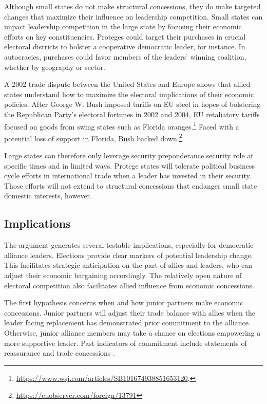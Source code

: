 \documentclass[12pt]{article}
\begin{document}
Although small states do not make structural concessions, they do make targeted changes that maximize their influence on leadership competition.
Small states can impact leadership competition in the large state by focusing their economic efforts on key constituencies.
Proteges could target their purchases in crucial electoral districts to bolster a cooperative democratic leader, for instance. 
In autocracies, purchases could favor members of the leaders' winning coalition, whether by geography or sector.


A 2002 trade dispute between the United States and Europe shows that allied states understand how to maximize the electoral implications of their economic policies. 
After George W. Bush imposed tariffs on EU steel in hopes of bolstering the Republican Party's electoral fortunes in 2002 and 2004, EU retaliatory tariffs focused on goods from swing states such as Florida oranges.\footnote{\url{https://www.wsj.com/articles/SB101674938851653120}.}
Faced with a potential loss of support in Florida, Bush backed down.\footnote{\url{https://euobserver.com/foreign/13791}}


Large states can therefore only leverage security preponderance security role at specific times and in limited ways.
Protege states will tolerate political business cycle efforts in international trade when a leader has invested in their security. 
Those efforts will not extend to structural concessions that endanger small state domestic interests, however.



\subsection{Implications}



The argument generates several testable implications, especially for democratic alliance leaders.
Elections provide clear markers of potential leadership change. 
This facilitates strategic anticipation on the part of allies and leaders, who can adjust their economic bargaining accordingly. 
The relatively open nature of electoral competition also facilitates allied influence from economic concessions. 


The first hypothesis concerns when and how junior partners make economic concessions. 
Junior partners will adjust their trade balance with allies when the leader facing replacement has demonstrated prior commitment to the alliance. 
Otherwise, junior alliance members may take a chance on elections empowering a more supportive leader. 
Past indicators of commitment include statements of reassurance \citep{Blankenship2020} and trade concessions \citep{WolfordKim2017}.
\end{document}
